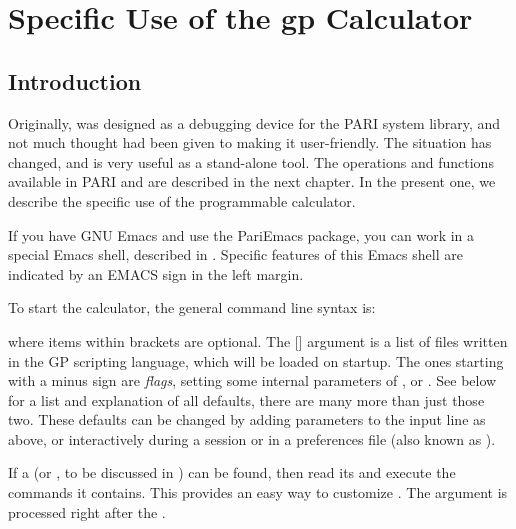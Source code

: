 %
%
\chapter{Specific Use of the gp Calculator}

\section{Introduction}

Originally,  was designed as a debugging device for the PARI system
library, and not much thought had been given to making it user-friendly. The
situation has changed, and  is very useful as a stand-alone tool. The
operations and functions available in PARI and  are described in
the next chapter. In the present one, we describe the specific use of the
 programmable calculator.

\emacs If you have GNU Emacs and use the PariEmacs package, you can work in a
special Emacs shell, described in . Specific features of
this Emacs shell are indicated by an EMACS sign in the left margin.


To start the calculator, the general command line syntax is:


\noindent
where items within brackets are optional. The [] argument is a
list of files written in the GP scripting language, which will be loaded on
startup. The ones starting with a minus sign are \emph{flags}, setting some
internal parameters of , or . See 
below for a list and explanation of all defaults, there are many more than
just those two. These defaults can be changed by adding parameters to the
input line as above, or interactively during a  session or in a
preferences file (also known as ).

If a  (or , to be discussed in
) can be found,  then read its and execute the
commands it contains. This provides an easy way to customize .
The  argument is processed right after the .

